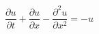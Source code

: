 \documentclass[12pt]{article}
\begin{document}
\begin{equation}
  \frac{\partial u}{\partial t} + \frac{\partial u}{\partial x} - \frac{\partial^2u}{\partial x^2} = -u
\end{equation}  
\end{document}
